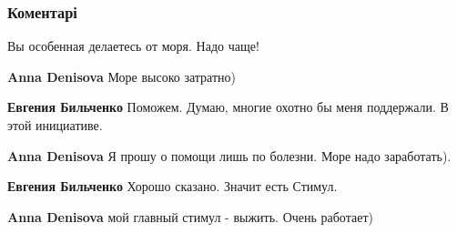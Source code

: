  
 
 
 
 
\subsubsection{Коментарі}
\label{sec:19_08_2021.fb.bilchenko_evgenia.4.proschanie_s_jugom.cmt}

\begin{itemize}
 
Вы особенная делаетесь от моря. Надо чаще! 💙

 
\textbf{Anna Denisova} Море высоко затратно)

 
\textbf{Евгения Бильченко} Поможем. Думаю, многие охотно бы меня поддержали. В этой инициативе.

 
\textbf{Anna Denisova} Я прошу о помощи лишь по болезни. Море надо заработать).

 
\textbf{Евгения Бильченко} Хорошо сказано. Значит есть Стимул.

 
\textbf{Anna Denisova} мой главный стимул - выжить. Очень работает)
\end{itemize}

